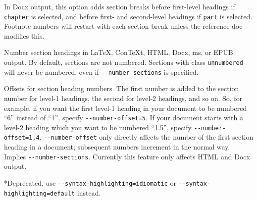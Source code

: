 \documentclass[
]{article}
\begin{document}
\begin{description}
In Docx output, this option adds section breaks before first-level
headings if \texttt{chapter} is selected, and before first- and
second-level headings if \texttt{part} is selected. Footnote numbers
will restart with each section break unless the reference doc modifies
this.
\item[\texttt{-N},
\texttt{-\/-number-sections={[}true\textbar{}false{]}}]
Number section headings in LaTeX, ConTeXt, HTML, Docx, ms, or EPUB
output. By default, sections are not numbered. Sections with class
\texttt{unnumbered} will never be numbered, even if
\texttt{-\/-number-sections} is specified.
\item[\texttt{-\/-number-offset=}\emph{NUMBER}{[}\texttt{,}\emph{NUMBER}\texttt{,}\emph{\ldots{}}{]}]
Offsets for section heading numbers. The first number is added to the
section number for level-1 headings, the second for level-2 headings,
and so on. So, for example, if you want the first level-1 heading in
your document to be numbered ``6'' instead of ``1'', specify
\texttt{-\/-number-offset=5}. If your document starts with a level-2
heading which you want to be numbered ``1.5'', specify
\texttt{-\/-number-offset=1,4}. \texttt{-\/-number-offset} only directly
affects the number of the first section heading in a document;
subsequent numbers increment in the normal way. Implies
\texttt{-\/-number-sections}. Currently this feature only affects HTML
and Docx output.
\item[\texttt{-\/-listings{[}=true\textbar{}false{]}}]
*Deprecated, use \texttt{-\/-syntax-highlighting=idiomatic} or
\texttt{-\/-syntax-highlighting=default} instead.


\end{description}
\end{document}
